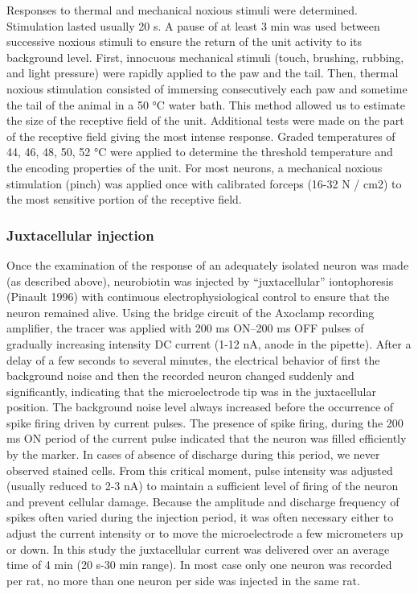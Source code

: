 \documentclass[a4paper,12pt,twoside]{report}
\begin{document}
Responses to thermal and mechanical noxious stimuli were determined. Stimulation lasted usually 20 s. A pause of at least 3 min was used between successive noxious stimuli to ensure the return of the unit activity to its background level. First, innocuous mechanical stimuli (touch, brushing, rubbing, and light pressure) were rapidly applied to the paw and the tail. Then, thermal noxious stimulation consisted of immersing consecutively each paw and sometime the tail of the animal in a 50 °C water bath. This method allowed us to estimate the size of the receptive field of the unit. Additional tests were made on the part of the receptive field giving the most intense response. Graded temperatures of 44, 46, 48, 50, 52 °C were applied to determine the threshold temperature and the encoding properties of the unit. For most neurons, a mechanical noxious stimulation (pinch) was applied once with calibrated forceps (16-32 N / cm2) to the most sensitive portion of the receptive field.

\subsubsection{Juxtacellular injection}

Once the examination of the response of an adequately isolated neuron was made (as described above), neurobiotin was injected by “juxtacellular” iontophoresis (Pinault 1996) with continuous electrophysiological control to ensure that the neuron remained alive. Using the bridge circuit of the Axoclamp recording amplifier, the tracer was applied with 200 ms ON–200 ms OFF pulses of gradually increasing intensity DC current (1-12 nA, anode in the pipette). After a delay of a few seconds to several minutes, the electrical behavior of first the background noise and then the recorded neuron changed suddenly and significantly, indicating that the microelectrode tip was in the juxtacellular position. The background noise level always increased before the occurrence of spike firing driven by current pulses. The presence of spike firing, during the 200 ms ON period of the current pulse indicated that the neuron was filled efficiently by the marker. In cases of absence of discharge during this period, we never observed stained cells. From this critical moment, pulse intensity was adjusted (usually reduced to 2-3 nA) to maintain a sufficient level of firing of the neuron and prevent cellular damage. Because the amplitude and discharge frequency of spikes often varied during the injection period, it was often necessary either to adjust the current intensity or to move the microelectrode a few micrometers up or down. In this study the juxtacellular current was delivered over an average time of 4 min (20 s-30 min range). In most case only one neuron was recorded per rat, no more than one neuron per side was injected in the same rat. 
\end{document}
